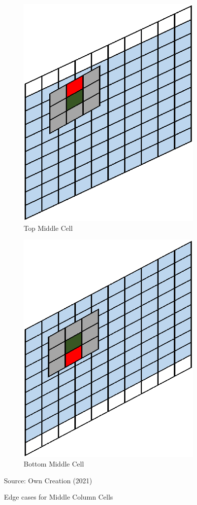 \begin{figure}[H]
\centering
\begin{subfigure}{.4\textwidth}
  \centering
  \includegraphics[width=.5\linewidth]{Figures/Chapter3/topmid}
  \caption{Top Middle Cell}
\end{subfigure}%
\begin{subfigure}{.4\textwidth}
  \centering
  \includegraphics[width=.5\linewidth]{Figures/Chapter3/botmid}
  \caption{Bottom Middle Cell}
\end{subfigure}
\caption{Edge cases for Middle Column Cells}
\begin{center}
Source: Own Creation (2021)
\end{center}
\label{fig:e3}
\end{figure}

